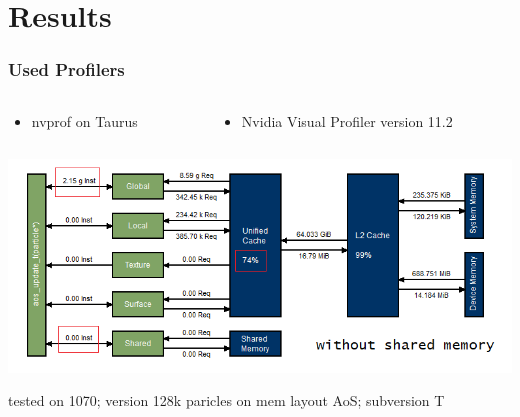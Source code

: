\documentclass[aspectratio=169]{beamer}
\begin{document}
\section{Results}
\begin{frame}
	\frametitle{Used Profilers}
	\begin{columns}
	\begin{column}{0.3\textwidth}
		\begin{itemize}
			\small \item nvprof on Taurus
		\end{itemize}
	\end{column}
	
	\begin{column}{0.5\textwidth}
		\begin{itemize}
			\small \item Nvidia Visual Profiler version 11.2
		\end{itemize}
	\end{column}
	\end{columns}
	\medskip
	\includegraphics[scale=0.50]{resources/128-1070-aos-update-t.png}
	
	\smallskip
	\small tested on 1070; version 128k paricles on mem layout AoS; subversion T
\end{frame}
\end{document}
